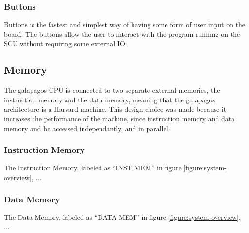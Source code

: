 \subsubsection{Buttons}

Buttons is the fastest and simplest way of having some form of user input on the board.
The buttons allow the user to interact with the program running on the SCU without requiring some external IO.

\subsection{Memory}

The \Gls{galapagos} CPU is connected to two separate external memories, the instruction memory and the data memory, meaning that the \Gls{galapagos} architecture is a Harvard machine.
This design choice was made because it increases the performance of the machine, since instruction memory and data memory and be accessed independantly, and in parallel. 

\subsubsection{Instruction Memory}

The Instruction Memory, labeled as ``INST MEM'' in figure \vref{figure:system-overview}, ...

\subsubsection{Data Memory}

The Data Memory, labeled as ``DATA MEM'' in figure \vref{figure:system-overview}, ...

